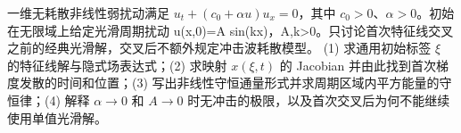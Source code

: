 一维无耗散非线性弱扰动满足 \(u_t+(c_0+\alpha u)u_x=0\)，其中 \(c_{0}>0\)、\(\alpha >0\)。初始在无限域上给定光滑周期扰动 u(x,0)=A sin(kx)，A,k>0。只讨论首次特征线交叉之前的经典光滑解，交叉后不额外规定冲击波耗散模型。
(1) 求通用初始标签 \(\xi \) 的特征线解与隐式场表达式；(2) 求映射 \(x(\xi ,t)\) 的 Jacobian 并由此找到首次梯度发散的时间和位置；(3) 写出非线性守恒通量形式并求周期区域内平方能量的守恒律；(4) 解释 \(\alpha \to 0\) 和 \(A\to 0\) 时无冲击的极限，以及首次交叉后为何不能继续使用单值光滑解。
